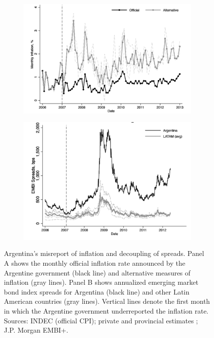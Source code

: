 \documentclass[12pt]{article}
\theoremstyle{plain}
\begin{document}
\begin{figure}[htbp]
	\centering
	\begin{subfigure}[t]{0.49\textwidth}
		\centering
		\includegraphics[width=\linewidth]{../../pro-default-model/results/inflation_arg.png}
		\label{fig:argentina_inflation}
	\end{subfigure}\hfill
	\begin{subfigure}[t]{0.49\textwidth}
		\centering
		\includegraphics[width=\linewidth]{../../pro-default-model/results/spread_arg.png}
		\label{fig:argentina_spread}
	\end{subfigure}
	\caption{Argentina’s misreport of inflation and decoupling of spreads. Panel A shows the monthly official inflation rate announced by the Argentine government (black line) and alternative measures of inflation (gray lines). Panel B shows annualized emerging market bond index spreads for Argentina (black line) and other Latin American countries (gray lines). Vertical lines denote the first month in which the Argentine government underreported the inflation rate. Sources: INDEC (official CPI); private and provincial estimates \citep{Cavallo2013}; J.P. Morgan EMBI+.}
	\label{fig:argentina_spreads}
\end{figure}
\end{document}
